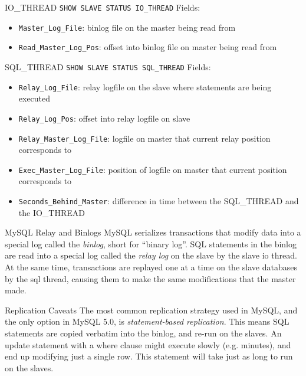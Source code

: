 \documentclass[14pt]{beamer}
\newcommand{\myitem}{\item[\textbullet]}
\begin{document}
\begin{frame}{IO\_THREAD}
  \texttt{SHOW SLAVE STATUS IO\_THREAD} Fields:
  \begin{itemize}
  \myitem \texttt{Master\_Log\_File}: binlog file on the master being read from
  \myitem \texttt{Read\_Master\_Log\_Pos}: offset into binlog file on master being read from
  \end{itemize}
\end{frame}

\begin{frame}{SQL\_THREAD}
  \texttt{SHOW SLAVE STATUS SQL\_THREAD} Fields:
  \begin{itemize}
  \myitem \texttt{Relay\_Log\_File}: relay logfile on the slave where statements are being executed
  \myitem \texttt{Relay\_Log\_Pos}: offset into relay logfile on slave
  \myitem \texttt{Relay\_Master\_Log\_File}: logfile on master that current relay position corresponds to
  \myitem \texttt{Exec\_Master\_Log\_File}: position of logfile on master that current position corresponds to
  \myitem \texttt{Seconds\_Behind\_Master}: difference in time between the
      SQL\_THREAD and the IO\_THREAD
  \end{itemize}
\end{frame}

\begin{frame}{MySQL Relay and Binlogs}
  MySQL serializes transactions that modify data into a special log called the
  \emph{binlog}, short for ``binary log''.
  \newline
  \newline
  SQL statements in the binlog are read into a special log called the
  \emph{relay log} on the slave by the slave io thread. At the same time,
  transactions are replayed one at a time on the slave databases by the
  sql thread, causing them to make the same modifications that the master made.
\end{frame}

\begin{frame}{Replication Caveats}
  The most common replication strategy used in MySQL, and the only option in
  MySQL 5.0, is \emph{statement-based replication}. This means SQL statements
  are copied verbatim into the binlog, and re-run on the slaves.
  \newline
  \newline
  An update statement with a where clause might execute slowly (e.g. minutes),
  and end up modifying just a single row. This statement will take just as long
  to run on the slaves.
\end{frame}
\end{document}
